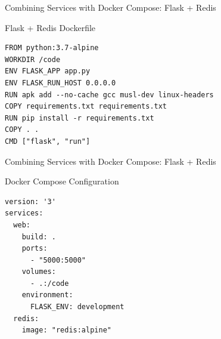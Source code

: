 \documentclass[10pt, compress, aspectratio=169, xcolor={table,usenames,dvipsnames}]{beamer}
\begin{document}
\begin{frame}[label={sec:orgc0ecd46},fragile]{Combining Services with Docker Compose: Flask + Redis}
 \begin{block}{Flask + Redis Dockerfile}
\lstset{language=dockerfile,label= ,caption= ,captionpos=b,numbers=none}
\begin{lstlisting}
FROM python:3.7-alpine
WORKDIR /code
ENV FLASK_APP app.py
ENV FLASK_RUN_HOST 0.0.0.0
RUN apk add --no-cache gcc musl-dev linux-headers
COPY requirements.txt requirements.txt
RUN pip install -r requirements.txt
COPY . .
CMD ["flask", "run"]
\end{lstlisting}
\end{block}
\end{frame}

\begin{frame}[label={sec:org95fe7b6},fragile]{Combining Services with Docker Compose: Flask + Redis}
 \begin{block}{Docker Compose Configuration}
\lstset{language=yaml,label= ,caption= ,captionpos=b,numbers=none}
\begin{lstlisting}
version: '3'
services:
  web:
    build: .
    ports:
      - "5000:5000"
    volumes:
      - .:/code
    environment:
      FLASK_ENV: development
  redis:
    image: "redis:alpine"
\end{lstlisting}
\end{block}
\end{frame}
\end{document}
